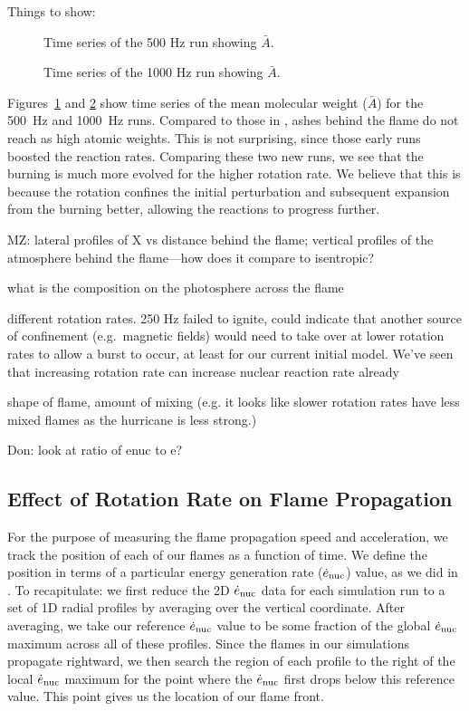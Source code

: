\documentclass[preprint,times,tighten]{aastex63}
\newcommand{\enucdot}{\dot{e}_{\rm nuc}}
\begin{document}
Things to show:

\begin{figure}[t]
\centering
{}
\caption{\label{fig:time_series_500} Time series of the 500 Hz run showing $\bar{A}$.}
\end{figure}

\begin{figure}[t]
\centering
{}
\caption{\label{fig:time_series_1000} Time series of the 1000 Hz run showing $\bar{A}$.}
\end{figure}


Figures~\ref{fig:time_series_500} and \ref{fig:time_series_1000} show
time series of the mean molecular weight ($\bar{A}$) for the 500~Hz and 1000~Hz
runs.  Compared to those in \cite{flame_wave1}, ashes behind the flame
do not reach as high atomic weights.  This is not surprising, since
those early runs boosted the reaction rates.  Comparing these two new
runs, we see that the burning is much more evolved for the higher
rotation rate.  We believe that this is because the rotation confines
the initial perturbation and subsequent expansion from the burning
better, allowing the reactions to progress further.

MZ: lateral profiles of X vs distance behind the flame; 
vertical profiles of the atmosphere behind the flame---how does it compare to isentropic?

what is the composition on the photosphere across the flame

different rotation rates. 250 Hz failed to ignite, could indicate that another source of confinement (e.g.\ magnetic fields) would need to take
over at lower rotation rates to allow a burst to occur, at least for our current initial model. We've seen that increasing rotation rate can
increase nuclear reaction rate already

shape of flame, amount of mixing (e.g. it looks like slower rotation rates have less mixed flames as the hurricane is less strong.)

Don: look at ratio of enuc to e?

\subsection{Effect of Rotation Rate on Flame Propagation}\label{ssec:rot_propagation}

For the purpose of measuring the flame propagation speed and acceleration, we track the position of each of our flames
as a function of time. We define the position in terms of a particular energy generation rate ($\enucdot$) value, as we did in \citet{flame_wave1}.
To recapitulate: we first reduce the 2D $\enucdot$ data for each simulation run to a set of 1D radial profiles by averaging
over the vertical coordinate. After averaging, we take our reference $\enucdot$ value to be some fraction of the global $\enucdot$
maximum across all of these profiles. Since the flames in our simulations propagate rightward, we then search the region of
each profile to the right of the local $\enucdot$ maximum for the point where the $\enucdot$ first drops below this reference
value. This point gives us the location of our flame front.
\end{document}
